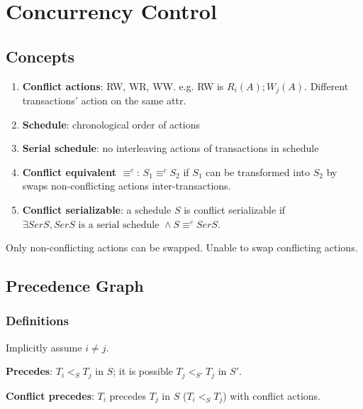 \documentclass[a4paper]{report}
\begin{document}
\chapter{Concurrency Control}
\section{Concepts}
\begin{enumerate}
\item \textbf{Conflict actions}: RW, WR, WW. e.g. RW is $R_i(A); W_j(A)$. Different transactions' action on the same attr. 
\item \textbf{Schedule}: chronological order of actions 
\item \textbf{Serial schedule}: no interleaving actions of transactions in schedule
\item \textbf{Conflict equivalent $\equiv^c$}: $S_1 \equiv^c S_2$ if $S_1$ can be transformed into $S_2$ by swaps non-conflicting actions inter-transactions.
\item \textbf{Conflict serializable}: a schedule $S$ is conflict serializable if $\exists SerS, SerS\text{ is a serial schedule } \wedge S\equiv^c SerS$.
\end{enumerate}

Only non-conflicting actions can be swapped. Unable to swap conflicting actions.


\section{Precedence Graph}
\subsection{Definitions}
Implicitly assume $i\neq j$.

\textbf{Precedes}: $T_i <_S T_j$ in $S$; it is possible $T_j <_{S'} T_j$ in $S'$.

\textbf{Conflict precedes}: $T_i$ precedes $T_j$ in $S$ ($T_i <_S T_j$) with conflict actions. 
\end{document}
